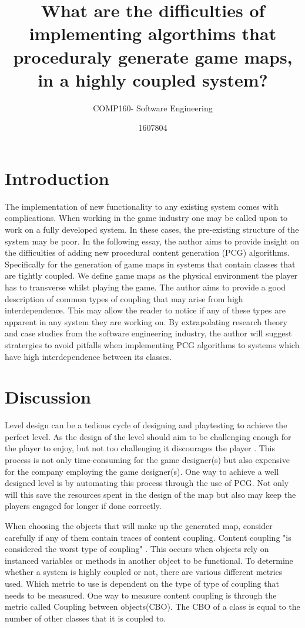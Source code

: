 \documentclass{scrartcl}
\title{What are the difficulties of implementing algorthims that proceduraly generate game maps, in a highly coupled system?}
\subtitle{COMP160- Software Engineering}
\author{1607804}
\begin{document}
\maketitle


\section{Introduction}
The implementation of new functionality to any existing system comes with complications. When working in the game industry one may be called upon to work on a fully developed system. In these cases, the pre-existing structure of the system may be poor. In the following essay, the author aims to provide insight on the difficulties of adding new procedural content generation (PCG) algorithms. Specifically for the generation of game maps in systems that contain classes that are tightly coupled. We define game maps as the physical environment the player has to transverse whilst playing the game. The author aims to provide a good description of common types of coupling that may arise from high interdependence. This may allow the reader to notice if any of these types are apparent in any system they are working on. By extrapolating research theory and case studies from the software engineering industry, the author will suggest stratergies to avoid pitfalls when implementing PCG algorithms to systems which have high interdependence between its classes. 

\section{Discussion}
 Level design can be a tedious cycle of designing and playtesting to achieve the perfect level. As the design of the level should aim to be challenging enough for the player to enjoy, but not too challenging it discourages the player \cite {kayali2011retro}. This process is not only time-consuming for the game designer(s) but also expensive for the company employing the game designer(s). One way to achieve a well designed level is by automating this process through the use of PCG. Not only will this save the resources spent in the design of the map but also may keep the players engaged for longer if done correctly.

When choosing the objects that will make up the generated map, consider carefully if any of them contain traces of content coupling. Content coupling "is considered the worst type of coupling" \cite[p. 95]{briand1999unified}. This occurs when objects rely on instanced variables or methods in another object to be functional.  To determine whether a system is highly coupled or not, there are various different metrics used. Which metric to use is dependent on the type of type of coupling that needs to be measured. One way to measure content coupling is through the metric called Coupling between objects(CBO)\cite {chidamber1994metrics}. The CBO of a class is equal to the number of other classes that it is coupled to.
\end{document}
